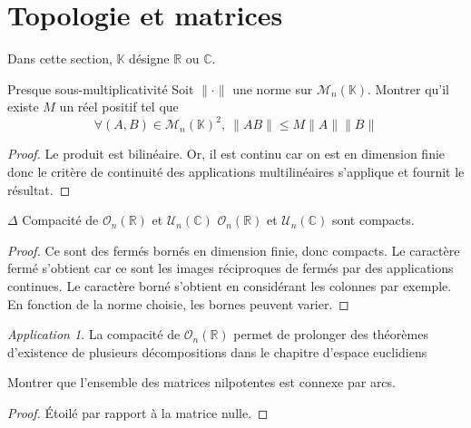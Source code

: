 \documentclass[french,a4paper]{article}
\newcommand{\R}{\mathbb{R}}
\newcommand{\C}{\mathbb{C}}
\newcommand{\K}{\mathbb{K}}
\theoremstyle{plain}
\theoremstyle{definition}
\theoremstyle{remark}
\newtheorem*{app}{Application}
\begin{document}
\section{Topologie et matrices}

Dans cette section, $\K$ désigne $\R$ ou $\C$.

\begin{ex}[Moulin.48]{Presque sous-multiplicativité}
	Soit $\lVert\cdot\rVert$ une norme sur $\mathcal{M}_n(\K)$. Montrer qu'il existe $M$ un réel positif tel que $$\forall(A,B)\in\mathcal{M}_n(\K)^2,\ \lVert AB\rVert\leqslant M\lVert A\rVert\lVert B\rVert$$
\end{ex}
\begin{proof}
	Le produit est bilinéaire. Or, il est continu car on est en dimension finie donc le critère de continuité des applications multilinéaires s'applique et fournit le résultat.
\end{proof}

\begin{ex}[Moulin.49]{$\Delta$ Compacité de $\mathcal{O}_n(\R)$ et $\mathcal{U}_n(\C)$} $\mathcal{O}_n(\R)$ et $\mathcal{U}_n(\C)$ sont compacts.
\end{ex} \begin{proof}
	Ce sont des fermés bornés en dimension finie, donc compacts. Le caractère fermé s'obtient car ce sont les images réciproques de fermés par des applications continues. Le caractère borné s'obtient en considérant les colonnes par exemple. En fonction de la norme choisie, les bornes peuvent varier.
\end{proof}
\begin{app} La compacité de $\mathcal{O}_n(\R)$ permet de prolonger des théorèmes d'existence de plusieurs décompositions dans le chapitre d'espace euclidiens \end{app}

\begin{ex}{}
	Montrer que l'ensemble des matrices nilpotentes est connexe par arcs.
\end{ex}
\begin{proof}
	Étoilé par rapport à la matrice nulle.
\end{proof}
\end{document}
